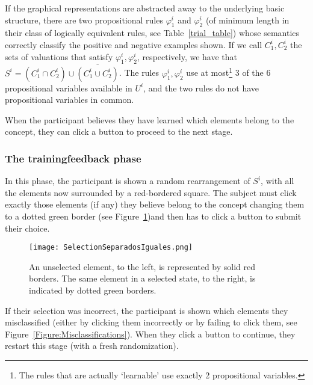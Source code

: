 If the graphical representations are abstracted away to the underlying basic structure, there are two propositional rules $\varphi^i_1$ and $\varphi^i_2$ (of minimum length in their class of logically equivalent rules, see Table~\ref{trial_table}) whose semantics correctly classify the positive and negative examples shown. If we call $C^i_1, C^i_2$ the sets of valuations that satisfy $\varphi^i_1, \varphi^i_2$, respectively, we have that $S^i = (C^i_1 \cap C^i_2) \cup \overline{(C^i_1 \cup C^i_2)}$. The rules $\varphi^i_1, \varphi^i_2$ use at most\footnote{The rules that are actually `learnable' use exactly 2 propositional variables.} 3 of the 6 propositional variables available in $U^i$, and the two rules do not have propositional variables in common. 

When the participant believes they have learned which elements belong to the concept, they can click a button to proceed to the next stage.

\subsubsection{The training\textendash feedback phase}\label{Subsection:training}

In this phase, the participant is shown a random rearrangement of $S^i$, with all the elements now surrounded by a red-bordered square. %
The subject must click exactly those elements (if any) they believe belong to the concept \textemdash changing them to a dotted green border (see Figure~\ref{Figure:ElementSquares})\textemdash and then has to click a button to submit their choice.

\begin{figure}[h!] 
\begin{center}
    	\texttt{[image: SelectionSeparadosIguales.png]}
	\caption{An unselected element, to the left, is represented by solid red borders. The same element in a selected state, to the right, is indicated by dotted green borders.}
	\label{Figure:ElementSquares}
\end{center}
\end{figure}

If their selection was incorrect, the participant is shown which elements they misclassified (either by clicking them incorrectly or by failing to click them, see Figure~\ref{Figure:Misclassifications}). When they click a button to continue, they restart this stage (with a fresh randomization).

